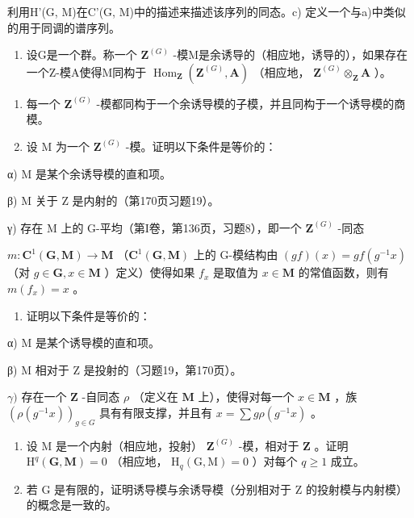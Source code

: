 利用H'(G, M)在C'(G, M)中的描述来描述该序列的同态。c) 定义一个与a)中类似的用于同调的谱序列。

\begin{enumerate}
\def\labelenumi{\arabic{enumi})}
\setcounter{enumi}{11}
\tightlist
\item
  设G是一个群。称一个 \(\mathbf{Z}^{(G)}\) -模M是余诱导的（相应地，诱导的），如果存在一个Z-模A使得M同构于 \(\operatorname{Hom}_{\mathbf{Z}}(\mathbf{Z}^{(G)}, \mathbf{A})\) （相应地， \(\mathbf{Z}^{(G)} \otimes_{\mathbf{Z}} \mathbf{A}\) ）。
\end{enumerate}

\begin{enumerate}
\def\labelenumi{\alph{enumi})}
\item
  每一个 \(\mathbf{Z}^{(G)}\) -模都同构于一个余诱导模的子模，并且同构于一个诱导模的商模。
\item
  设 M 为一个 \(\mathbf{Z}^{(G)}\) -模。证明以下条件是等价的：
\end{enumerate}

α) M 是某个余诱导模的直和项。

β) M 关于 Z 是内射的（第170页习题19）。

γ) 存在 M 上的 G-平均（第I卷，第136页，习题8），即一个 \(\mathbf{Z}^{(G)}\) -同态

\(m: \mathbf{C}^{1}(\mathbf{G}, \mathbf{M}) \to \mathbf{M}\) （\(\mathbf{C}^{1}(\mathbf{G}, \mathbf{M})\) 上的 G-模结构由 \((gf)(x) = gf(g^{-1}x)\) （对 \(g \in \mathbf{G}, x \in \mathbf{M}\) ）定义）使得如果 \(f_{x}\) 是取值为 \(x \in \mathbf{M}\) 的常值函数，则有 \(m(f_{x}) = x\) 。

\begin{enumerate}
\def\labelenumi{\alph{enumi})}
\setcounter{enumi}{2}
\tightlist
\item
  证明以下条件是等价的：
\end{enumerate}

α) M 是某个诱导模的直和项。

β) M 相对于 Z 是投射的（习题19，第170页）。

\(\gamma)\) 存在一个 \(\mathbf{Z}\) -自同态 \(\rho\) （定义在 \(\mathbf{M}\) 上），使得对每一个 \(x \in \mathbf{M}\) ，族 \((\rho(g^{-1} x))_{g \in G}\) 具有有限支撑，并且有 \(x = \sum g\rho(g^{-1} x)\) 。

\begin{enumerate}
\def\labelenumi{\alph{enumi})}
\setcounter{enumi}{3}
\item
  设 M 是一个内射（相应地，投射） \(\mathbf{Z}^{(G)}\) -模，相对于 \(\mathbf{Z}\) 。证明 \(\mathrm{H}^q (\mathbf{G},\mathbf{M}) = 0\) （相应地， \(\mathrm{H}_q(\mathrm{G},\mathrm{M}) = 0\) ）对每个 \(q\geqslant 1\) 成立。
\item
  若 G 是有限的，证明诱导模与余诱导模（分别相对于 Z 的投射模与内射模）的概念是一致的。
\end{enumerate}

